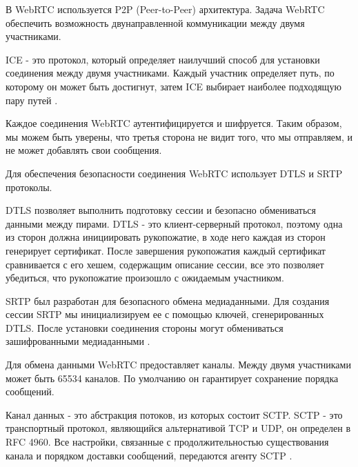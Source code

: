 
В WebRTC используется P2P (Peer-to-Peer) архитектура. Задача WebRTC обеспечить возможность двунаправленной коммуникации между двумя участниками.

ICE - это протокол, который определяет наилучший способ для установки соединения между двумя участниками. Каждый участник определяет путь, по которому он может быть достигнут, затем ICE выбирает наиболее подходящую пару путей \cite{v22}.


Каждое соединения WebRTC аутентифицируется и шифруется. Таким образом, мы можем быть уверены, что третья сторона не видит того, что мы отправляем, и не может добавлять свои сообщения.

Для обеспечения безопасности соединения WebRTC использует DTLS и SRTP протоколы.

DTLS позволяет выполнить подготовку сессии и безопасно обмениваться данными между пирами. DTLS - это клиент-серверный протокол, поэтому одна из сторон должна инициировать рукопожатие, в ходе него каждая из сторон генерирует сертификат. После завершения рукопожатия каждый сертификат сравнивается с его хешем, содержащим описание сессии, все это позволяет убедиться, что рукопожатие произошло с ожидаемым участником.

SRTP был разработан для безопасного обмена медиаданными. Для создания сессии SRTP мы инициализируем ее с помощью ключей, сгенерированных DTLS. После установки соединения стороны могут обмениваться зашифрованными медиаданными \cite{v23}.


Для обмена данными WebRTC предоставляет каналы. Между двумя участниками может быть 65534 каналов. По умолчанию он гарантирует сохранение порядка сообщений.

Канал данных - это абстракция потоков, из которых состоит SCTP. SCTP - это транспортный протокол, являющийся альтернативой TCP и UDP, он определен в RFC 4960. Все настройки, связанные с продолжительностью существования канала и порядком доставки сообщений, передаются агенту SCTP \cite{v24}.

\pagebreak